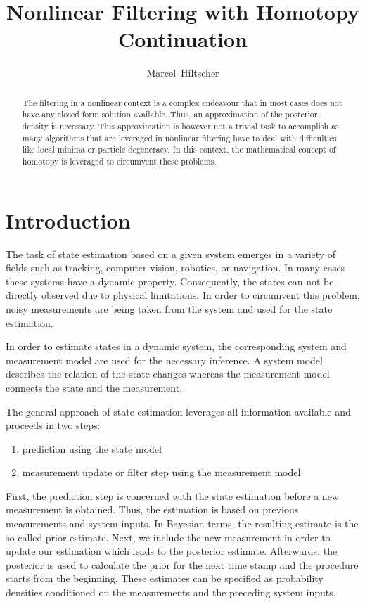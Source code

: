 \documentclass[a4paper]{IEEEtran}
\title{Nonlinear Filtering with Homotopy Continuation}
\author{Marcel~Hiltscher}
\begin{document}
\maketitle

\begin{abstract}
The filtering in a nonlinear context is a complex endeavour that in most cases does not have any closed form solution available. Thus, an approximation of the posterior density
is necessary. This approximation is however not a trivial task to accomplish as many algorithms that are leveraged in nonlinear filtering have to deal with difficulties like local minima or particle degeneracy.
In this context, the mathematical concept of homotopy is leveraged to circumvent these problems. 
\end{abstract}

\section{Introduction}
\label{ch:intro}

The task of state estimation based on a given system emerges in a variety of fields such as tracking, computer vision, robotics, or navigation.
In many cases these systems have a dynamic property. Consequently, the states can not be directly observed due to physical limitations. In order to 
circumvent this problem, noisy measurements are being taken from the system and used for the state estimation. 

In order to estimate states in a dynamic system, the corresponding system and measurement model are used for the necessary inference. A system model describes the relation of the state changes whereas the measurement
model connects the state and the measurement.

The general approach of state estimation leverages all information available and proceeds in two steps:
\begin{enumerate}
    \item prediction using the state model
    \item measurement update or filter step using the measurement model
\end{enumerate}

First, the prediction step is concerned with the state estimation before a new measurement is obtained. Thus, the estimation is based on previous measurements and system inputs.
In Bayesian terms, the resulting estimate is the so called prior estimate. Next, we include the new measurement in order to update our estimation which leads to the posterior estimate. 
Afterwards, the posterior is used to calculate the prior for the next time stamp and the procedure starts from the beginning. These estimates can be specified as probability densities conditioned 
on the measurements and the preceding system inputs.
\end{document}
